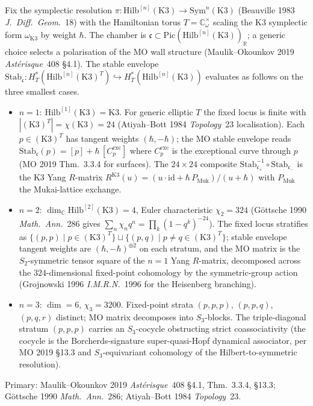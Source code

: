 \begin{remark}[MO stable envelope, explicit at \texorpdfstring{$n = 1, 2, 3$}{n = 1, 2, 3}]
\label{rem:modtr-mo-small-n}
Fix the symplectic resolution
$\pi\colon \mathrm{Hilb}^{[n]}(\mathrm K3) \to \mathrm{Sym}^n(\mathrm K3)$
(Beauville 1983 \emph{J.\ Diff.\ Geom.}~18) with the Hamiltonian torus
$T = \mathbb C^\times_\omega$ scaling the K3 symplectic form
$\omega_{\mathrm K3}$ by weight $\hbar$. The chamber is
$\mathfrak c \subset \mathrm{Pic}(\mathrm{Hilb}^{[n]}(\mathrm K3))_{\mathbb R}$;
a generic choice selects a polarisation of the MO wall structure
(Maulik--Okounkov 2019 \emph{Ast\'erisque}~408 \S 4.1). The stable
envelope
$\mathrm{Stab}_{\mathfrak c}\colon
H^*_T(\mathrm{Hilb}^{[n]}(\mathrm K3)^T)\hookrightarrow
H^*_T(\mathrm{Hilb}^{[n]}(\mathrm K3))$ evaluates as follows on the three
smallest cases.
\begin{itemize}
\item $n = 1$: $\mathrm{Hilb}^{[1]}(\mathrm K3) = \mathrm{K3}$. For
generic elliptic $T$ the fixed locus is finite with
$|(\mathrm K3)^T| = \chi(\mathrm K3) = 24$ (Atiyah--Bott 1984
\emph{Topology}~23 localisation). Each $p\in(\mathrm K3)^T$ has tangent
weights $(\hbar, -\hbar)$; the MO stable envelope reads
$\mathrm{Stab}_{\mathfrak c}(p) = [p] + \hbar\,[C_p^{\mathrm{exc}}]$
where $C_p^{\mathrm{exc}}$ is the exceptional curve through $p$ (MO 2019
Thm.~3.3.4 for surfaces). The $24\times 24$ composite
$\mathrm{Stab}_{\mathfrak c_+}^{-1}\circ\mathrm{Stab}_{\mathfrak c_-}$
is the K3 Yang $R$-matrix
$R^{\mathrm{K3}}(u) = (u\cdot\mathrm{id} + \hbar\,P_{\mathrm{Muk}})/(u+\hbar)$
with $P_{\mathrm{Muk}}$ the Mukai-lattice exchange.
\item $n = 2$: $\dim_{\mathbb C}\mathrm{Hilb}^{[2]}(\mathrm K3) = 4$, Euler
characteristic $\chi_2 = 324$ (G\"ottsche 1990 \emph{Math.\ Ann.}~286
gives $\sum_n\chi_n q^n = \prod_k(1-q^k)^{-24}$). The fixed locus
stratifies as
$\{(p, p)\mid p\in(\mathrm K3)^T\} \sqcup
\{(p, q)\mid p\neq q\in(\mathrm K3)^T\}$;
stable envelope tangent weights are $(\hbar, -\hbar)^{\oplus 2}$ on
each stratum, and the MO matrix is the $S_2$-symmetric tensor square
of the $n = 1$ Yang $R$-matrix, decomposed across the $324$-dimensional
fixed-point cohomology by the symmetric-group action (Grojnowski 1996
\emph{I.M.R.N.}~1996 for the Heisenberg branching).
\item $n = 3$: $\dim = 6$, $\chi_3 = 3200$. Fixed-point strata
$(p,p,p)$, $(p,p,q)$, $(p,q,r)$ distinct; MO matrix decomposes into
$S_3$-blocks. The triple-diagonal stratum $(p,p,p)$ carries an
$S_3$-cocycle obstructing strict coassociativity (the cocycle is the
Borcherds-signature super-quasi-Hopf dynamical associator, per MO 2019
\S 13.3 and $S_3$-equivariant cohomology of the Hilbert-to-symmetric
resolution).
\end{itemize}
Primary: Maulik--Okounkov 2019 \emph{Ast\'erisque}~408 \S 4.1, Thm.~3.3.4,
\S 13.3; G\"ottsche 1990 \emph{Math.\ Ann.}~286; Atiyah--Bott 1984
\emph{Topology}~23.
\end{remark}

